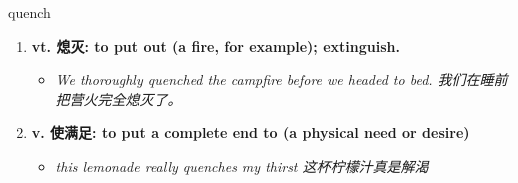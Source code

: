 
\begin{frame}
{\huge quench}
\begin{center}
\begin{enumerate}\Large
  \item \textbf{vt. 熄灭: to put out (a fire, for example); extinguish.}
  \begin{itemize}
    \item \em{\Large{We thoroughly quenched the campfire before we headed to bed. 我们在睡前把营火完全熄灭了。}}
  \end{itemize}
  \item \textbf{v. 使满足: to put a complete end to (a physical need or desire)}
  \begin{itemize}
    \item \em{\Large{this lemonade really quenches my thirst 这杯柠檬汁真是解渴}}
  \end{itemize}
\end{enumerate}
\end{center}
\end{frame}
